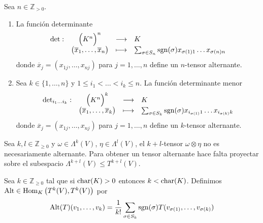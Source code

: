 \begin{ejem} Sea $n\in\mathbb{Z}_{>0}$.
\begin{enumerate}
\item La funci\'on determinante
$$\begin{array}{rccl}
\det: & \Big(K^n\Big)^n &\longrightarrow & K\\
&\big(\overline{x}_1,\ldots,\overline{x}_n\big) & \longmapsto & \sum_{\sigma\in S_n}\operatorname{sgn}(\sigma)x_{\sigma(1)1}\ldots x_{\sigma(n)n}
\end{array}
$$
donde $\overline{x}_j=(x_{1j},\ldots,x_{nj})$ para $j=1,\ldots,n$ define un $n$-tensor alternante.
\item Sea $k\in\{1,\ldots,n\}$ y $1\le i_1<\ldots<i_k\le n$. La funci\'on determinante menor
$$\begin{array}{rccl}
\det_{i_1\ldots i_k}: & \Big(K^n\Big)^k &\longrightarrow & K\\
&\big(\overline{x}_1,\ldots,\overline{x}_k\big) & \longmapsto & \sum_{\sigma\in S_k}\operatorname{sgn}(\sigma)x_{i_{\sigma(1)}1}\ldots x_{i_{\sigma(k)}k}
\end{array}
$$
donde $\overline{x}_j=(x_{1j},\ldots,x_{nj})$ para $j=1,\ldots,n$ define un $k$-tensor alternante.
\end{enumerate}
\end{ejem}

\begin{obs}
Sea $k,l\in\mathbb{Z}_{\ge 0}$ y $\omega\in\Lambda^k(V)$, $\eta\in\Lambda^l(V)$, el $k+l$-tensor $\omega\otimes\eta$ no es necesariamente alternante. Para obtener un tensor alternante hace falta proyectar sobre el subespacio $\Lambda^{k+l}(V)\le T^{k+l}(V)$.
\end{obs}

\begin{defn}
Sea $k\in\mathbb{Z}_{\ge 0}$ tal que si $\operatorname{char}(K)>0$ entonces $k<\operatorname{char}(K)$. Definimos $\operatorname{Alt}\in\operatorname{Hom}_K\left(T^k(V),T^k(V)\right)$ por
$$\operatorname{Alt}(T)(v_1,\ldots,v_k)=\dfrac{1}{k!}\sum_{\sigma\in S_k}\operatorname{sgn}(\sigma)T(v_{\sigma(1)},\ldots,v_{\sigma(k)})$$
\end{defn}

